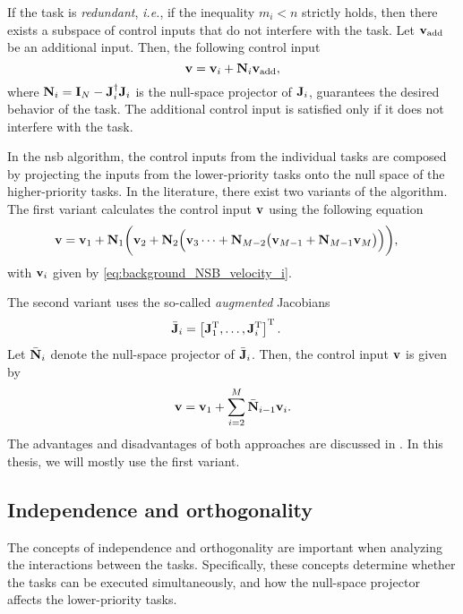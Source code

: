 If the task is \emph{redundant}, \emph{i.e.}, if the inequality $m_i < n$ strictly holds, then there exists a subspace of control inputs that do not interfere with the task.
Let $\mathbf{v}_{\rm add}$ be an additional input.
Then, the following control input
\begin{equation}
    \mathbf{v} = \mathbf{v}_i + \mathbf{N}_i \mathbf{v}_{\rm add},
\end{equation}
where $\mathbf{N}_i = \mathbf{I}_{N} - \mathbf{J}_i^{\dagger}\mathbf{J}_i$ is the null-space projector of $\mathbf{J}_i$, guarantees the desired behavior of the task.
The additional control input is satisfied only if it does not interfere with the task.

In the \gls{nsb} algorithm, the control inputs from the individual tasks are composed by projecting the inputs from the lower-priority tasks onto the null space of the higher-priority tasks.
In the literature, there exist two variants of the algorithm.
The first variant calculates the control input $\mathbf{v}$ using the following equation
\begin{align}
    \mathbf{v} &= \mathbf{v}_{1} + \mathbf{N}_1 \biggl(\mathbf{v}_{2} + \mathbf{N}_2\Bigl(\mathbf{v}_3 \cdots + \mathbf{N}_{M-2}\bigl(\mathbf{v}_{M-1} + \mathbf{N}_{M-1}\mathbf{v}_M\bigr)\Bigr)\biggr),
    \label{eq:background_NSB_recursive}
\end{align}
with $\mathbf{v}_{i}$ given by \eqref{eq:background_NSB_velocity_i}.

The second variant uses the so-called \emph{augmented} Jacobians
\begin{align}
    \Bar{\mathbf{J}}_i &= \left[\mathbf{J}_1^{\mathrm{T}}, \ldots, \mathbf{J}_i^{\mathrm{T}}\right]^{\mathrm{T}}.
\end{align}
Let $\Bar{\mathbf{N}}_i$ denote the null-space projector of $\Bar{\mathbf{J}}_i$.
Then, the control input $\mathbf{v}$ is given by
\begin{equation}
    \mathbf{v} = \mathbf{v}_1 + \sum_{i=2}^M \Bar{\mathbf{N}}_{i-1} \mathbf{v}_i.
\end{equation}
The advantages and disadvantages of both approaches are discussed in \cite{antonelli_stability_2008}.
In this thesis, we will mostly use the first variant.

\subsection{Independence and orthogonality}
The concepts of independence and orthogonality are important when analyzing the interactions between the tasks.
Specifically, these concepts determine whether the tasks can be executed simultaneously, and how the null-space projector affects the lower-priority tasks.

